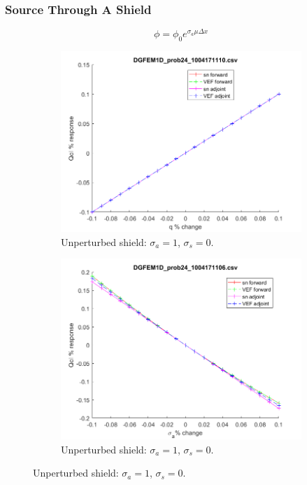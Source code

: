 \documentclass[12pt]{report}
\newcommand{\sigs}{\sigma_s}
\newcommand{\siga}{\sigma_a}
\begin{document}
\subsubsection{Source Through A Shield}
\begin{equation}
\phi = \phi_0 e^{\sigma_a \mu \Delta x}
\end{equation}

\begin{figure}[H]
\label{Absorber}
\centering
\begin{subfigure}{.5\textwidth}
  \centering
  \includegraphics[width=.98\linewidth]{figures/24qSens.png}
  \caption{Unperturbed shield: $\siga=1$, $\sigs=0$. }
  \label{fig:sfig1}
\end{subfigure}%
\begin{subfigure}{.5\textwidth}
  \centering
  \includegraphics[width=.98\linewidth]{figures/24sigaSens.png}
  \caption{Unperturbed shield: $\siga=1$, $\sigs=0$. }
  \label{fig:sfig2}
\end{subfigure}
\end{figure}
\end{document}
